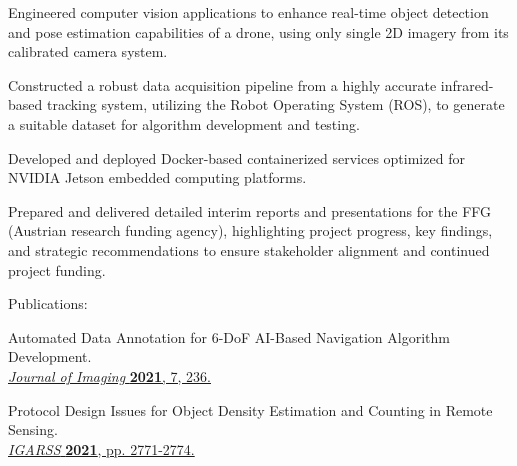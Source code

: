 \begin{tightemize}
    \item Engineered computer vision applications to enhance real-time object detection and pose estimation capabilities of a drone, using only single 2D imagery from its calibrated camera system.

    \item Constructed a robust data acquisition pipeline from a highly accurate infrared-based tracking system, utilizing the Robot Operating System (ROS), to generate a suitable dataset for algorithm development and testing.

    \item Developed and deployed Docker-based containerized services optimized for NVIDIA Jetson embedded computing platforms.

    \item Prepared and delivered detailed interim reports and presentations for the FFG (Austrian research funding agency), highlighting project progress, key findings, and strategic recommendations to ensure stakeholder alignment and continued project funding.
\end{tightemize}
\medsep
\textsf{Publications:}
\begin{tightemize}
    \item Automated Data Annotation for 6-DoF AI-Based Navigation Algorithm Development. \\\href{https://doi.org/10.3390/jimaging7110236}{\textit{Journal of Imaging} \textbf{2021}, 7, 236.}
    
    \item Protocol Design Issues for Object Density Estimation and Counting in Remote Sensing. \\\href{https://doi.org/10.1109/IGARSS47720.2021.9553934}{\textit{IGARSS} \textbf{2021}, pp. 2771-2774.}
\end{tightemize}